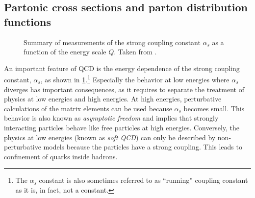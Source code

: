 \subsection{Partonic cross sections and parton distribution functions}
\label{subsec:factorisation}

\begin{figure}
  \caption[Summary of measurements of the strong coupling constant $\alpha_s$.]{Summary of measurements of the strong coupling constant $\alpha_s$ as a function of the energy scale $Q$. Taken from . }
  \label{fig:alphas}
\end{figure}


An important feature of QCD is the energy dependence of the strong coupling constant, $\alpha_s$, as shown in \cref{fig:alphas}.\footnote{The $\alpha_s$ constant is also sometimes referred to as ``running'' coupling constant as it is, in fact, not a constant.} Especially the behavior at low energies where $\alpha_s$ diverges has important consequences, as it requires to separate the treatment of physics at low energies and high energies. 
At high energies, perturbative calculations of the matrix elements can be used because $\alpha_s$ becomes small. This behavior is also known as \emph{asymptotic freedom} and implies that strongly interacting particles behave like free particles at high energies. 
Conversely, the physics at low energies (known as \emph{soft QCD}) can only be described by non-perturbative models because the particles have a strong coupling. This leads to confinement of quarks inside hadrons.


